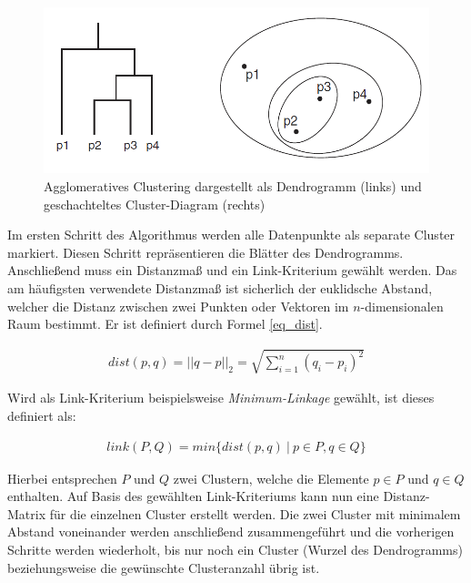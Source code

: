 \begin{figure}[H]
    \centering
    \includegraphics[width=0.7\linewidth]{resources/img/grundlagen/agglo_clustering}
    \caption[Darstellung Funktionsweise Agglomeratives Clustering]{Agglomeratives Clustering dargestellt als Dendrogramm (links) und geschachteltes Cluster-Diagram (rechts)}
    \label{fig:grund_agglo_clustering}
\end{figure}

Im ersten Schritt des Algorithmus werden alle Datenpunkte als separate Cluster markiert. Diesen Schritt
repräsentieren die Blätter des Dendrogramms.
Anschließend muss ein Distanzmaß und ein Link-Kriterium gewählt werden.
Das am häufigsten verwendete Distanzmaß ist sicherlich der euklidsche Abstand, welcher die Distanz zwischen zwei Punkten
oder Vektoren im $n$-dimensionalen Raum bestimmt. Er ist definiert durch Formel \ref{eq_dist}.

\begin{ceqn}
\begin{align}
\label{eq_dist}
    dist(p,q) = ||q-p||_2 = \sqrt{\sum_{i=1}^n (q_i-p_i)^2}
\end{align}
\end{ceqn}

Wird als Link-Kriterium beispielsweise \textit{Minimum-Linkage} gewählt, ist dieses definiert als:

\begin{ceqn}
\begin{align}
\label{eq_linkage}
    link(P, Q) = min\{ dist(p,q)\ |\ p \in P, q \in Q\}
\end{align}
\end{ceqn}

Hierbei entsprechen $P$ und $Q$ zwei Clustern, welche die Elemente $p \in P$ und $q \in Q$ enthalten.
Auf Basis des gewählten Link-Kriteriums kann nun eine Distanz-Matrix für die einzelnen Cluster
erstellt werden.
Die zwei Cluster mit minimalem Abstand voneinander werden anschließend zusammengeführt und die
vorherigen Schritte werden wiederholt, bis nur noch ein Cluster (Wurzel des Dendrogramms) beziehungsweise
die gewünschte Clusteranzahl übrig ist. \cite[]{GeorgeSeif2018, tan2007introduction}


